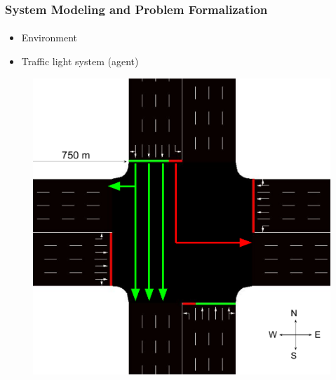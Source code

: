 \documentclass[aspectratio=169]{beamer}
\begin{document}
\begin{frame}
\frametitle{System Modeling and Problem Formalization}
\framesubtitle{}
\vspace{1cm}

\begin{minipage}{0.3\textwidth}
\begin{itemize}
    \item Environment
    \item Traffic light system (agent)
\end{itemize}
\end{minipage}%
\hfill
\begin{minipage}{0.7\textwidth}
\begin{figure}
    \centering
    \includegraphics[width=0.6\linewidth]{images/Intersection.pdf}
\end{figure}
\end{minipage}
\end{frame}
\end{document}

